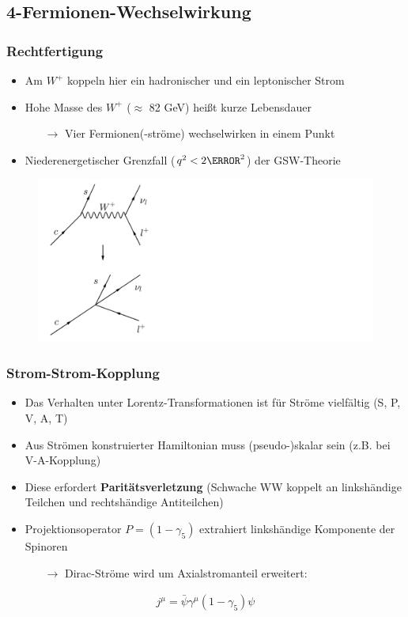 \documentclass[hyperref={pdfpagelabels=false}]{beamer}
\begin{document}
\subsection{4-Fermionen-Wechselwirkung}
\begin{frame}
\frametitle{Rechtfertigung}
 \begin{minipage}[h]{0.58\textwidth}
\begin{itemize}
 \item Am $W^+$ koppeln hier ein hadronischer  und ein leptonischer Strom
 \item Hohe Masse des $W^+$ ($\approx$ 82 GeV) heißt kurze Lebensdauer
 \begin{itemize}
 \item[$\rightarrow$] Vier Fermionen(-ströme) wechselwirken in einem Punkt
 \end{itemize}
 \item Niederenergetischer Grenzfall ($q^2<2\GeV^2$) der GSW-Theorie
\end{itemize}
 \end{minipage}
 \begin{minipage}[h]{0.38\textwidth}
 \begin{figure}[h]
  \includegraphics[width = 3\textwidth]{../Abbildungen/4FermiPraes.png}
 \end{figure}
 \end{minipage}
 \end{frame}

 \begin{frame}
  \frametitle{Strom-Strom-Kopplung}
  \begin{itemize}
   \item Das Verhalten unter Lorentz-Transformationen ist für Ströme vielfältig (S, P, V, A, T)
   \item Aus Strömen konstruierter Hamiltonian muss (pseudo-)skalar sein (z.B. bei V-A-Kopplung)
   \item Diese erfordert \textbf{Paritätsverletzung} (Schwache WW koppelt an linkshändige Teilchen und rechtshändige Antiteilchen)
   \item Projektionsoperator $P=(1-\gamma_5)$ extrahiert linkshändige Komponente der Spinoren
   \begin{itemize}
    \item [$\rightarrow$] Dirac-Ströme wird um Axialstromanteil erweitert:
   \end{itemize}
  \end{itemize}
  \begin{align}
   j^\mu = \bar \psi \gamma^\mu (1-\gamma_5) \psi
  \end{align}
 \end{frame}
\end{document}
